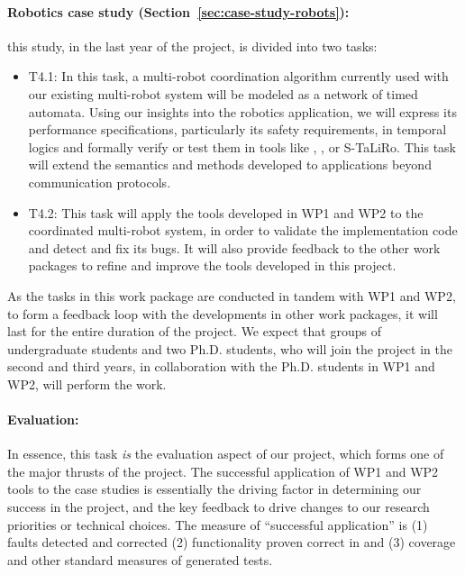 \paragraph {Robotics case study (Section~\ref{sec:case-study-robots}):} this study, in the last year of the project, is divided into two tasks:
\noindent \begin{itemize}[labelsep=3pt,leftmargin=12pt]
  \item T4.1: In this task, a multi-robot coordination algorithm
    currently used with our existing multi-robot system will be
    modeled as a network of timed automata.  Using our insights into
    the robotics application, we will express its performance
    specifications, particularly its safety requirements, in temporal
    logics and formally verify or test them in tools like \uppaal,
    \prism, or S-TaLiRo.  This task will extend the semantics and
    methods developed to applications beyond communication protocols.
  \item T4.2: This task will apply the tools developed in WP1 and WP2 to the coordinated multi-robot system, in order to validate the implementation code and detect and fix its bugs.  It will also provide feedback to the other work packages to refine and improve the tools developed in this project.
  \end{itemize}

As the tasks in this work package are conducted in tandem with WP1 and WP2, to form a feedback loop with the developments in other work packages, it will last for the entire duration of the project.
We expect that groups of undergraduate students and two
Ph.D. students, who will join the project in the second and third
years, in collaboration with the Ph.D. students in WP1 and WP2, will
perform the work.

\paragraph{Evaluation:} In essence, this task \emph{is} the evaluation
aspect of our project, which forms one of the major thrusts of
the project.  The successful application of WP1 and WP2 tools to the case studies is
essentially the driving factor in determining our success in the
project, and the key feedback to drive changes to our research
priorities or technical choices.  The measure of ``successful
application'' is (1) faults detected and corrected (2) functionality
proven correct in \framac and (3) coverage and other standard measures
of generated tests.


